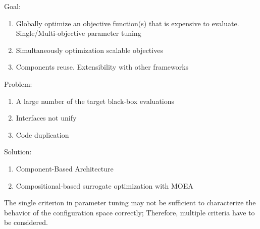         Goal:
        \begin{enumerate}
            \item Globally optimize an objective function(s) that is expensive to evaluate. Single/Multi-objective parameter tuning
            \item Simultaneously optimization scalable objectives
            \item Components reuse. Extensibility with other frameworks
        \end{enumerate}

        Problem:
        \begin{enumerate}
            \item A large number of the target black-box evaluations
            \item Interfaces not unify
            \item Code duplication
        \end{enumerate}

        Solution:
        \begin{enumerate}
            \item Component-Based Architecture
            \item Compositional-based surrogate optimization with MOEA
        \end{enumerate}


    The single criterion in parameter tuning may not be sufficient to characterize the behavior of the configuration space correctly; Therefore, multiple criteria have to be considered.
